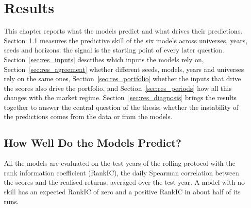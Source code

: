 
\chapter{Results}
\label{ch:results}

This chapter reports what the models predict and what drives their predictions. Section~\ref{sec:res_performance} measures the predictive skill of the six models across universes, years, seeds and horizons: the signal is the starting point of every later question. Section~\ref{sec:res_inputs} describes which inputs the models rely on, Section~\ref{sec:res_agreement} whether different seeds, models, years and universes rely on the same ones, Section~\ref{sec:res_portfolio} whether the inputs that drive the scores also drive the portfolio, and Section~\ref{sec:res_periods} how all this changes with the market regime. Section~\ref{sec:res_diagnosis} brings the results together to answer the central question of the thesis: whether the instability of the predictions comes from the data or from the models.

\section{How Well Do the Models Predict?}
\label{sec:res_performance}

All the models are evaluated on the test years of the rolling protocol with the rank information coefficient (RankIC), the daily Spearman correlation between the scores and the realised returns, averaged over the test year. A model with no skill has an expected RankIC of zero and a positive RankIC in about half of its runs.

